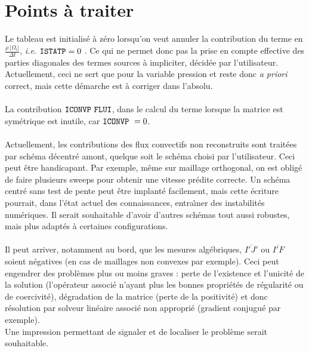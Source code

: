 \section*{Points \`a traiter}
Le tableau  est initialis\'e \`a z\'ero lorsqu'on veut annuler la
contribution du terme en
$\displaystyle\frac{\rho \ |\Omega_i|}{\Delta t}$, {\it i.e.} $\text{\texttt{ISTATP}} = 0 $ . Ce qui ne permet donc pas la prise en
compte effective des parties diagonales des termes sources \`a impliciter,
d\'ecid\'ee par l'utilisateur. Actuellement, ceci ne sert que pour la variable
pression et reste donc {\it a priori} correct, mais cette d\'emarche est \`a
corriger dans l'absolu.\\\\
La contribution $\var{ICONVP}\ \var{FLUI}$, dans le calcul du terme
 lorsque la matrice est sym\'etrique est inutile, car
$\text{\texttt{ICONVP}}\ = 0$. \\\\
Actuellement, les contributions des  flux convectifs non reconstruits sont
trait\'ees par sch\'ema d\'ecentr\'e amont, quelque soit le sch\'ema choisi par
l'utilisateur. Ceci peut \^etre handicapant. Par exemple, m\^eme sur
maillage orthogonal, on est oblig\'e de faire plusieurs sweeps pour obtenir une
vitesse pr\'edite correcte. Un sch\'ema centr\'e sans test de pente peut
\^etre implant\'e facilement, mais cette \'ecriture pourrait, dans l'\'etat
actuel des connaissances, entra\^\i ner des instabilit\'es
num\'eriques. Il serait souhaitable d'avoir d'autres sch\'emas tout aussi
robustes, mais plus adapt\'es \`a certaines configurations.\\\\
Il peut arriver, notamment au bord, que les mesures alg\'ebriques,
$\overline{I'J'}$ ou $\overline{I'F}$ soient n\'egatives (en cas de maillages
non convexes par exemple). Ceci peut engendrer des probl\`emes plus ou moins
graves : perte de l'existence et l'unicit\'e de la solution (l'op\'erateur associ\'e n'ayant plus les bonnes propri\'et\'es de r\'egularit\'e
ou de coercivit\'e), d\'egradation de la matrice (perte de la positivit\'e) et donc r\'esolution par solveur lin\'eaire
associ\'e non appropri\'e (gradient conjugu\'e par exemple).\\
Une impression permettant de signaler et de localiser le probl\`eme serait souhaitable.


